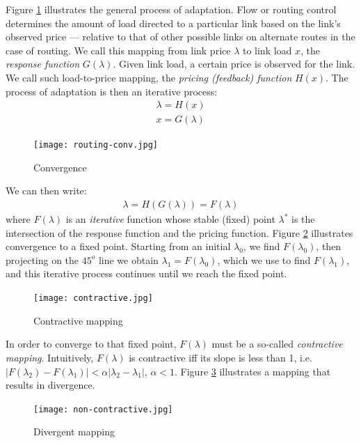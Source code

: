\documentclass{article}
\begin{document}
Figure \ref{fig:routing-conv} illustrates the general process of adaptation.
Flow or routing control determines the amount of load directed to a particular link based
on the link's observed price --- 
relative to that of other possible links on alternate routes in the case of routing.
We call this mapping from link price $\lambda$ to link load $x$, 
the {\em response function} $G(\lambda)$.
Given link load, a certain price is observed for the link.
We call such load-to-price mapping, the {\em pricing (feedback) function} $H(x)$.
The process of adaptation is then an iterative process:
\begin{eqnarray*}
\lambda = H(x) \\
x = G(\lambda)
\end{eqnarray*}

\begin{figure}[htbp]
   \centering
   \texttt{[image: routing-conv.jpg]} %
   \caption{Convergence}
   \label{fig:routing-conv}
\end{figure}


We can then write:
\begin{eqnarray*}
\lambda = H(G(\lambda))  = F(\lambda)
\end{eqnarray*}
where $F(\lambda)$ is an {\em iterative} function whose stable (fixed) point $\lambda^*$ is the intersection of
the response function and the pricing function.
Figure \ref{fig:contractive} illustrates convergence to a fixed point.
Starting from an initial $\lambda_0$,
we find $F(\lambda_0)$,
then projecting on the $45^{o}$ line we obtain $\lambda_1 = F(\lambda_0)$,
which we use to find $F(\lambda_1)$,
and this iterative process continues until we reach the fixed point.

\begin{figure}[htbp]
   \centering
   \texttt{[image: contractive.jpg]} %
   \caption{Contractive mapping}
   \label{fig:contractive}
\end{figure}


In order to converge to that fixed point, $F(\lambda)$ must be a so-called {\em contractive mapping}.
Intuitively,
$F(\lambda)$ is contractive iff its slope is less than 1, i.e.
$|F(\lambda_2) - F(\lambda_1)| < \alpha |\lambda_2 - \lambda_1|$, $\alpha < 1$.
Figure \ref{fig:non-contractive} illustrates a mapping that results in divergence.

\begin{figure}[htbp]
   \centering
   \texttt{[image: non-contractive.jpg]} %
   \caption{Divergent mapping}
   \label{fig:non-contractive}
\end{figure}
\end{document}
